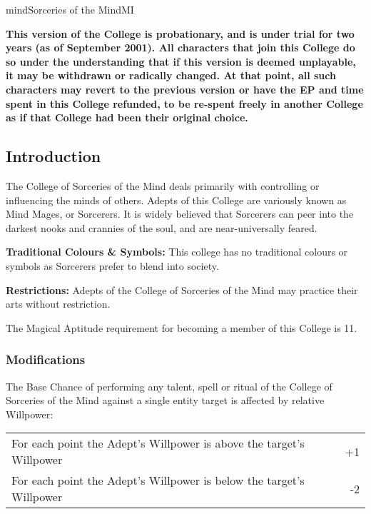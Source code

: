 \begin{college}[1.6]{mind}{Sorceries of the Mind}{MI}

\textbf{This version of the College is probationary, and is under
trial for two years (as of September 2001).  All characters that join
this College do so under the understanding that if this version is
deemed unplayable, it may be withdrawn or radically changed.  At that
point, all such characters may revert to the previous version or have
the EP and time spent in this College refunded, to be re-spent freely
in another College as if that College had been their original choice.}

\subsection{Introduction}

The College of Sorceries of the Mind deals primarily with controlling
or influencing the minds of others. Adepts of this College are
variously known as Mind Mages, or Sorcerers. It is widely believed
that Sorcerers can peer into the darkest nooks and crannies of the
soul, and are near-universally feared.

\textbf{Traditional Colours \& Symbols:} This college has no
traditional colours or symbols as Sorcerers prefer to blend into
society.

\textbf{Restrictions:} Adepts of the College of Sorceries of the Mind
may practice their arts without restriction.

The Magical Aptitude requirement for becoming a member of this College
is 11.

\subsubsection{Modifications}

The Base Chance of performing any talent, spell or ritual of the
College of Sorceries of the Mind against a single entity target is
affected by relative Willpower:

\begin{inline}
\begin{tabularx}{\linewidth}{Xr}
For each point the Adept's Willpower is above the target's Willpower	& +1 \\
For each point the Adept's Willpower is below the target's Willpower	& -2 \\
\end{tabularx}
\end{inline}


\end{college}
